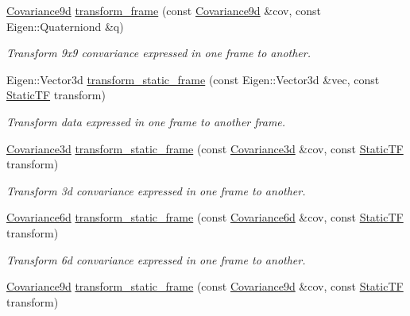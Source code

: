 \begin{DoxyCompactItemize}
\mbox{\hyperlink{group__nodelib_ga6df3c37d3cd74b3e6919e734575bb9b7}{Covariance9d}} \mbox{\hyperlink{group__nodelib_ga885808031ecb3f68701172b0e33f37cd}{transform\+\_\+frame}} (const \mbox{\hyperlink{group__nodelib_ga6df3c37d3cd74b3e6919e734575bb9b7}{Covariance9d}} \&cov, const Eigen\+::\+Quaterniond \&q)
\begin{DoxyCompactList}\small\item\em Transform 9x9 convariance expressed in one frame to another. \end{DoxyCompactList}\item 
Eigen\+::\+Vector3d \mbox{\hyperlink{group__nodelib_ga93f1ca2f4ebdb2423f81d88b4fa77c62}{transform\+\_\+static\+\_\+frame}} (const Eigen\+::\+Vector3d \&vec, const \mbox{\hyperlink{group__nodelib_gacff0983128574bbbe115917b13e57a63}{Static\+TF}} transform)
\begin{DoxyCompactList}\small\item\em Transform data expressed in one frame to another frame. \end{DoxyCompactList}\item 
\mbox{\hyperlink{group__nodelib_ga56776cc8f5410a6bfeafa085fcd6fe30}{Covariance3d}} \mbox{\hyperlink{group__nodelib_ga3a1e55d923c06a8914f7fe570dd42c9b}{transform\+\_\+static\+\_\+frame}} (const \mbox{\hyperlink{group__nodelib_ga56776cc8f5410a6bfeafa085fcd6fe30}{Covariance3d}} \&cov, const \mbox{\hyperlink{group__nodelib_gacff0983128574bbbe115917b13e57a63}{Static\+TF}} transform)
\begin{DoxyCompactList}\small\item\em Transform 3d convariance expressed in one frame to another. \end{DoxyCompactList}\item 
\mbox{\hyperlink{group__nodelib_gadc24a922dd3f6a7ff0d7aed9bda42bca}{Covariance6d}} \mbox{\hyperlink{group__nodelib_gaab4caf957e54695a814cedf5fc45aeb1}{transform\+\_\+static\+\_\+frame}} (const \mbox{\hyperlink{group__nodelib_gadc24a922dd3f6a7ff0d7aed9bda42bca}{Covariance6d}} \&cov, const \mbox{\hyperlink{group__nodelib_gacff0983128574bbbe115917b13e57a63}{Static\+TF}} transform)
\begin{DoxyCompactList}\small\item\em Transform 6d convariance expressed in one frame to another. \end{DoxyCompactList}\item 
\mbox{\hyperlink{group__nodelib_ga6df3c37d3cd74b3e6919e734575bb9b7}{Covariance9d}} \mbox{\hyperlink{group__nodelib_gacfea1c0d9ca98b288f6b8f2d17bc4fc0}{transform\+\_\+static\+\_\+frame}} (const \mbox{\hyperlink{group__nodelib_ga6df3c37d3cd74b3e6919e734575bb9b7}{Covariance9d}} \&cov, const \mbox{\hyperlink{group__nodelib_gacff0983128574bbbe115917b13e57a63}{Static\+TF}} transform)

\end{DoxyCompactItemize}
